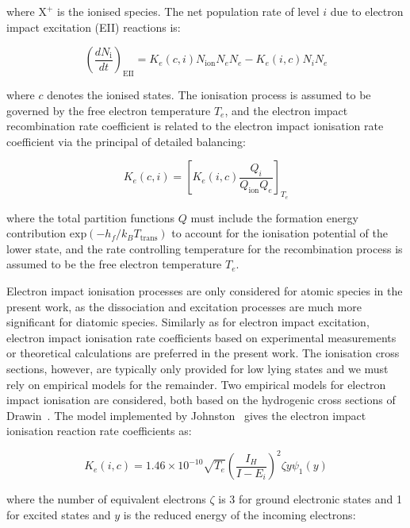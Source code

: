 \noindent where $\text{X}^+$ is the ionised species.
The net population rate of level $i$ due to electron impact excitation (EII) reactions is:

\begin{equation}
 \left ( \frac{dN_\text{i}}{dt} \right )_\text{EII} =  K_{e}(c,i) N_\text{ion} N_{e} N_{e} - K_{e} (i,c) N_{i} N_{e} 
\end{equation}

\noindent where $c$ denotes the ionised states.
The ionisation process is assumed to be governed by the free electron temperature $T_e$, and the electron impact recombination rate coefficient is related to the electron impact ionisation rate coefficient via the principal of detailed balancing:

\begin{equation}
 K_{e}(c,i) = \left [ K_{e}(i,c) \frac{Q_i}{Q_\text{ion} Q_e} \right ]_{T_e}
\end{equation}

\noindent where the total partition functions $Q$ must include the formation energy contribution $\text{exp} \left ( - h_f / k_B T_\text{trans} \right )$ to account for the ionisation potential of the lower state, and the rate controlling temperature for the recombination process is assumed to be the free electron temperature $T_e$.

\par

Electron impact ionisation processes are only considered for atomic species in the present work, as the dissociation and excitation processes are much more significant for diatomic species.
Similarly as for electron impact excitation, electron impact ionisation rate coefficients based on experimental measurements or theoretical calculations are preferred in the present work.
The ionisation cross sections, however, are typically only provided for low lying states and we must rely on empirical models for the remainder.
Two empirical models for electron impact ionisation are considered, both based on the hydrogenic cross sections of Drawin~\cite{drawin_1968}.
The model implemented by Johnston~\cite{JohnPhd} gives the electron impact ionisation reaction rate coefficients as:

\begin{equation}
 K_{e}(i,c) = 1.46 \times 10^{-10} \sqrt{ T_e } \left ( \frac{I_H}{I - E_i} \right )^2 \zeta y \psi_1 ( y )
\end{equation}

\noindent where the number of equivalent electrons $\zeta$ is 3 for ground electronic states and 1 for excited states and $y$ is the reduced energy of the incoming electrons:

